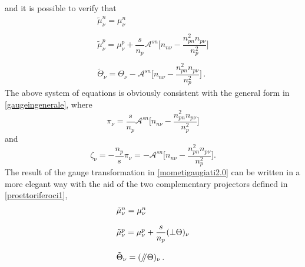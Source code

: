 \documentclass[usenatbib]{mnras}
\newcommand{\paral}{\, \mathbin{\!/\mkern-5mu/\!} \, }
\begin{document}
%
%
and  it is possible to verify that  %
%
\begin{equation} 
\label{mometigaugiati2.0}
\begin{array}{l}
\tilde{\mu}^n_{\nu} = \mu^n_{\nu}\\
\\
\tilde{\mu}^p_{\nu} = \mu^p_{\nu} +  \dfrac{s}{n_p} \mathcal{A}^{sn} \bigg[ n_{n\nu} - \dfrac{n_{pn}^2 n_{p\nu}}{n_p^2}  \bigg]\\
\\
\tilde{\Theta}_{\nu} = \Theta_\nu - \mathcal{A}^{sn} \bigg[ n_{n\nu} - \dfrac{n_{pn}^2 n_{p\nu}}{n_p^2}  \bigg] \, .
\end{array}
\end{equation}
%
The above system of equations is obviously consistent with the general form in \eqref{gaugeingenerale}, where
%
\begin{equation}
\pi_\nu = \dfrac{s}{n_p} \mathcal{A}^{sn} \bigg[ n_{n\nu} - \dfrac{n_{pn}^2 n_{p\nu}}{n_p^2}  \bigg]
\end{equation} 
%
and
%
\begin{equation}
\zeta_\nu = -\dfrac{n_p}{s} \pi_\nu = - \mathcal{A}^{sn} \bigg[ n_{n\nu} - \dfrac{n_{pn}^2 n_{p\nu}}{n_p^2}  \bigg].
\end{equation}
%
The result of the gauge transformation in \eqref{mometigaugiati2.0} can be written in a more elegant way with the aid of the two complementary projectors defined in \eqref{proettoriferoci1},
%
\begin{equation} 
\label{mometacomparison}
\begin{array}{l}
\tilde{\mu}^n_{\nu} = \mu^n_{\nu}\\
\\
\tilde{\mu}^p_{\nu} = \mu^p_{\nu} +  \dfrac{s}{n_p} ({\perp}\Theta)_\nu\\
\\
\tilde{\Theta}_{\nu} = (\paral \Theta)_\nu  \, .
\end{array}
\end{equation}
\end{document}
